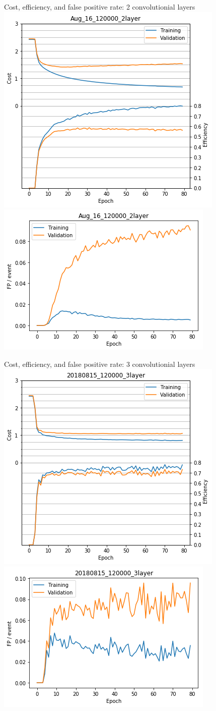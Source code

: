 \begin{frame}{Cost, efficiency, and false positive rate: 2 convolutionial layers}
   \centering
   \includegraphics[width=0.45\linewidth]{images/CNN_2Layer_Cost.png}
   \includegraphics[width=0.45\linewidth]{images/CNN_2Layer_FalsePositive.png}

\end{frame}

\begin{frame}{Cost, efficiency, and false positive rate: 3 convolutionial layers}
   \centering
   \includegraphics[width=0.45\linewidth]{images/CNN_3Layer_Cost.png}
   \includegraphics[width=0.45\linewidth]{images/CNN_3Layer_FalsePositive.png}

\end{frame}
